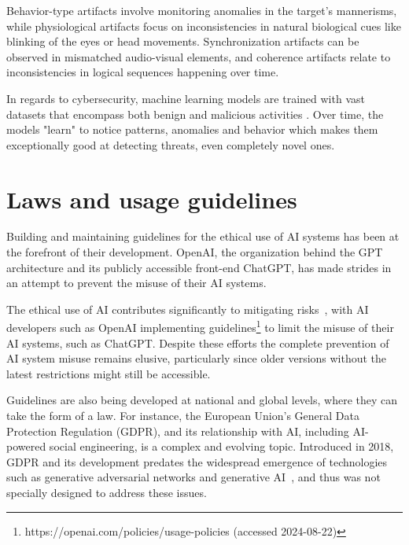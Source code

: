 Behavior-type artifacts involve monitoring anomalies in the target's mannerisms, while physiological artifacts focus on inconsistencies in natural biological cues like blinking of the eyes or head movements. Synchronization artifacts can be observed in mismatched audio-visual elements, and coherence artifacts relate to inconsistencies in logical sequences happening over time.

In regards to cybersecurity, machine learning models are trained with vast datasets that encompass both benign and malicious activities \citep{fakhouri_AI_Driven_Solutions_SE_Attacks_2024}. Over time, the models "learn" to notice patterns, anomalies and behavior which makes them exceptionally good at detecting threats, even completely novel ones.




\section{Laws and usage guidelines}
\begin{comment}
    


\end{comment}

Building and maintaining guidelines for the ethical use of AI systems has been at the forefront of their development. OpenAI, the organization behind the GPT architecture and its publicly accessible front-end ChatGPT, has made strides in an attempt to prevent the misuse of their AI systems.


The ethical use of AI contributes significantly to mitigating risks~\citep{gupta_From_ChatGPT_to_ThreatGPT_2023}, with AI developers such as OpenAI implementing guidelines\footnote{https://openai.com/policies/usage-policies (accessed 2024-08-22)} to limit the misuse of their AI systems, such as ChatGPT. Despite these efforts the complete prevention of AI system misuse remains elusive, particularly since older versions without the latest restrictions might still be accessible.



Guidelines are also being developed at national and global levels, where they can take the form of a law. For instance, the European Union's General Data Protection Regulation (GDPR), and its relationship with AI, including AI-powered social engineering, is a complex and evolving topic. Introduced in 2018, GDPR and its development predates the widespread emergence of technologies such as generative adversarial networks and generative AI~\citep{goodfellow_Generative_Adversarial_Networks_2020}, and thus was not specially designed to address these issues.

